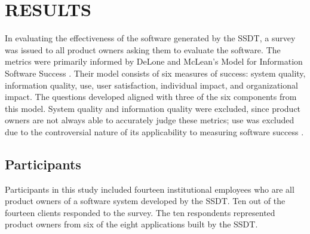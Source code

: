 \section{RESULTS}

In evaluating the effectiveness of the software generated by the SSDT, a survey was issued to all product owners asking them to evaluate the software. The metrics were primarily informed by DeLone and McLean's Model for Information Software Success \cite{delone1992softwaresuccess}. Their model consists of six measures of success: system quality, information quality, use, user satisfaction, individual impact, and organizational impact. The questions developed aligned with three of the six components from this model. System quality and information quality were excluded, since product owners are not always able to accurately judge these metrics; use was excluded due to the controversial nature of its applicability to measuring software success \cite{delone2003delone}. 

\subsection{Participants}
Participants in this study included fourteen institutional employees who are all product owners of a software system developed by the SSDT. Ten out of the fourteen clients responded to the survey. The ten respondents represented product owners from six of the eight applications built by the SSDT.

